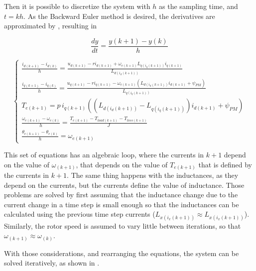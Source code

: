 Then it is possible to discretize the system with $h$ as the sampling time, and $t = kh$. As the Backward Euler method is desired, the derivatives are approximated by , resulting in 

\begin{equation}
    \frac{dy}{dt} = \frac{y(k+1) - y(k)}{h}
	\label{eq:backward_euler_example}
\end{equation}

\begin{equation}
	\left\{
	\begin{aligned}
		\frac{i_{d(k+1)}-i_{d(k)}}{h} = \frac{u_{d(k+1)} -r i_{d(k+1)} +\omega_{e(k+1)} L_{q(i_q(k+1))} i_{q(k+1)}}{L_{d(i_d(k+1))}}               \\
		\frac{i_{q(k+1)}-i_{q(k)}}{h} = \frac{u_{q(k+1)} -r i_{q(k+1)} - \omega_{e(k+1)} (L_{d(i_d(k+1))} i_{d(k+1)} +\psi_{PM})}{L_{q(i_q(k+1))}} \\
		T_{e(k+1)}  = p\, i_{q(k+1)}(( L_{d(i_d(k+1))} - L_{q(i_q(k+1))})i_{d(k+1)} + \psi_{PM})                                                   \\
		\frac{\omega_{e(k+1)} - \omega_{e(k)}}{h} = \frac{T_{e(k+1)}-T_{load(k+1)} - T_{loss(k+1)}}{J}                                             \\
		\frac{\theta_{e(k+1)} - \theta_{e(k)}}{h} = \omega_{e(k+1)}
	\end{aligned}
	\right.
	\label{eq:motor_with_inductances_discrete}
\end{equation}

This set of equations has an algebraic loop, where the currents in $k+1$ depend on the value of $\omega_{(k+1)}$, that depends on the value of $T_{e(k+1)}$ that is defined by the currents in $k+1$. The same thing happens with the inductances, as they depend on the currents, but the currents define the value of inductance. Those problems are solved by first assuming that the inductance change due to the current change in a time step is small enough so that the inductances can be calculated using the previous time step currents ($ L_{x(i_x(k+1))} \approx L_{x(i_x(k+1))} $). Similarly, the rotor speed is assumed to vary little between iterations, so that $\omega_{(k+1)} \approx \omega_{(k)}$.

With those considerations, and rearranging the equations, the system can be solved iteratively, as shown in .

